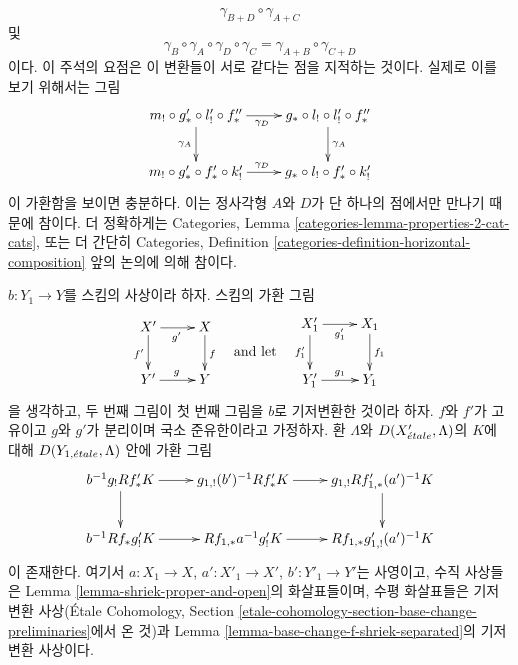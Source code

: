 \begin{remark}
$$\gamma_{B + D} \circ \gamma_{A + C}
$$
및
$$
\gamma_B \circ \gamma_A \circ \gamma_D \circ \gamma_C =
\gamma_{A + B} \circ \gamma_{C + D}
$$
이다. 이 주석의 요점은 이 변환들이 서로 같다는 점을 지적하는 것이다.
실제로 이를 보기 위해서는 그림
$$
\xymatrix{
m_! \circ g'_* \circ l'_! \circ f''_* \ar[r]_{\gamma_D} \ar[d]_{\gamma_A} &
g_* \circ l_! \circ l'_! \circ f''_* \ar[d]^{\gamma_A} \\
m_! \circ g'_* \circ f'_* \circ k'_! \ar[r]^{\gamma_D} &
g_* \circ l_! \circ f'_* \circ k'_!
}
$$
이 가환함을 보이면 충분하다. 이는 정사각형 $A$와 $D$가 단 하나의
점에서만 만나기 때문에 참이다. 더 정확하게는 Categories, Lemma
\ref{categories-lemma-properties-2-cat-cats}, 또는 더 간단히
Categories, Definition
\ref{categories-definition-horizontal-composition} 앞의 논의에 의해
참이다.
\end{remark}

\begin{lemma}
\label{lemma-shriek-proper-and-open-base-change}
$b : Y_1 \to Y$를 스킴의 사상이라 하자. 스킴의 가환 그림
$$
\vcenter{
\xymatrix{
X' \ar[r]_{g'} \ar[d]_{f'} & X \ar[d]^f \\
Y' \ar[r]^g & Y
}
}
\quad\text{and let}\quad
\vcenter{
\xymatrix{
X'_1 \ar[r]_{g'_1} \ar[d]_{f'_1} & X_1 \ar[d]^{f_1} \\
Y'_1 \ar[r]^{g_1} & Y_1
}
}
$$
을 생각하고, 두 번째 그림이 첫 번째 그림을 $b$로 기저변환한 것이라
하자. $f$와 $f'$가 고유이고 $g$와 $g'$가 분리이며 국소 준유한이라고
가정하자. 환 $\Lambda$와 $D(X'_{\acute{e}tale}, \Lambda)$의 $K$에 대해
$D(Y_{1, {\acute{e}tale}}, \Lambda)$ 안에 가환 그림
$$
\xymatrix{
b^{-1}g_!Rf'_*K \ar[d] \ar[r] &
g_{1, !}(b')^{-1}Rf'_*K \ar[r] &
g_{1, !}Rf'_{1, *}(a')^{-1}K \ar[d] \\
b^{-1}Rf_*g'_!K \ar[r] &
Rf_{1, *}a^{-1}g'_!K \ar[r] &
Rf_{1, *}g'_{1, !}(a')^{-1}K
}
$$
이 존재한다. 여기서 $a : X_1 \to X$, $a' : X'_1 \to X'$,
$b' : Y'_1 \to Y'$는 사영이고, 수직 사상들은 Lemma
\ref{lemma-shriek-proper-and-open}의 화살표들이며, 수평 화살표들은
기저변환 사상(\'Etale Cohomology, Section
\ref{etale-cohomology-section-base-change-preliminaries}에서 온 것)과
Lemma \ref{lemma-base-change-f-shriek-separated}의 기저변환 사상이다.
\end{lemma}

